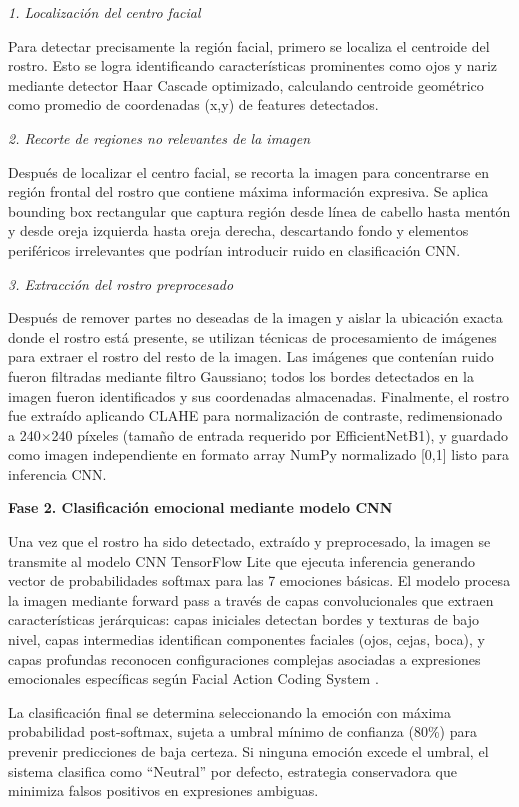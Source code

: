 \documentclass[journal,article,submit,pdftex,moreauthors]{Definitions/mdpi}
\begin{document}
	\textit{1. Localización del centro facial}
	
	Para detectar precisamente la región facial, primero se localiza el centroide del rostro. Esto se logra identificando características prominentes como ojos y nariz mediante detector Haar Cascade optimizado, calculando centroide geométrico como promedio de coordenadas (x,y) de features detectados.
	
	\textit{2. Recorte de regiones no relevantes de la imagen}
	
	Después de localizar el centro facial, se recorta la imagen para concentrarse en región frontal del rostro que contiene máxima información expresiva. Se aplica bounding box rectangular que captura región desde línea de cabello hasta mentón y desde oreja izquierda hasta oreja derecha, descartando fondo y elementos periféricos irrelevantes que podrían introducir ruido en clasificación CNN.
	
	\textit{3. Extracción del rostro preprocesado}
	
	Después de remover partes no deseadas de la imagen y aislar la ubicación exacta donde el rostro está presente, se utilizan técnicas de procesamiento de imágenes para extraer el rostro del resto de la imagen. Las imágenes que contenían ruido fueron filtradas mediante filtro Gaussiano; todos los bordes detectados en la imagen fueron identificados y sus coordenadas almacenadas. Finalmente, el rostro fue extraído aplicando CLAHE para normalización de contraste, redimensionado a 240$\times$240 píxeles (tamaño de entrada requerido por EfficientNetB1), y guardado como imagen independiente en formato array NumPy normalizado [0,1] listo para inferencia CNN.
	
	\textbf{Fase 2. Clasificación emocional mediante modelo CNN}
	
	Una vez que el rostro ha sido detectado, extraído y preprocesado, la imagen se transmite al modelo CNN TensorFlow Lite \cite{ref3,ref20} que ejecuta inferencia generando vector de probabilidades softmax para las 7 emociones básicas. El modelo procesa la imagen mediante forward pass a través de capas convolucionales que extraen características jerárquicas: capas iniciales detectan bordes y texturas de bajo nivel, capas intermedias identifican componentes faciales (ojos, cejas, boca), y capas profundas reconocen configuraciones complejas asociadas a expresiones emocionales específicas según Facial Action Coding System \cite{ref11,ref12}.
	
	La clasificación final se determina seleccionando la emoción con máxima probabilidad post-softmax, sujeta a umbral mínimo de confianza (80\%) para prevenir predicciones de baja certeza. Si ninguna emoción excede el umbral, el sistema clasifica como ``Neutral'' por defecto, estrategia conservadora que minimiza falsos positivos en expresiones ambiguas.
	
\end{document}
